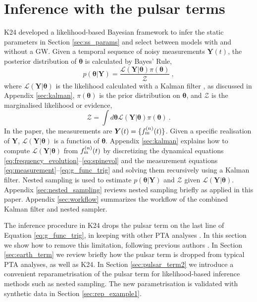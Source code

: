 \documentclass[fleqn,usenatbib,useAMS]{mnras}
\begin{document}
\section{Inference with the pulsar terms}\label{sec:pulsar_term}
K24 developed a likelihood-based Bayesian framework to infer the static parameters in Section \ref{sec:ss_params} and select between models with and without a GW. Given a temporal sequence of noisy measurements $\boldsymbol{Y}(t)$, the posterior distribution of $\boldsymbol{\theta}$ is calculated by Bayes' Rule,
\begin{equation}
	p(\boldsymbol{\theta} | \boldsymbol{Y}) = \frac{\mathcal{L}(\boldsymbol{Y} | \boldsymbol{\theta}) \pi(\boldsymbol{\theta})}{\mathcal{Z}} \ ,
\end{equation}
where $\mathcal{L}(\boldsymbol{Y}| \boldsymbol{\theta})$ is the likelihood calculated with a Kalman filter \citep{Kalman1}, as discussed in Appendix \ref{sec:kalman}, $\pi(\boldsymbol{\theta})$ is the prior distribution on $\boldsymbol{\theta}$, and $\mathcal{Z}$ is the marginalised likelihood or evidence,
\begin{equation}
	\mathcal{Z} = \int d \boldsymbol{\theta} \mathcal{L}(\boldsymbol{Y} | \boldsymbol{\theta})  \pi(\boldsymbol{\theta})  \ . \label{eq:model_evidence}
\end{equation}
In the paper, the measurements are ${\boldsymbol{Y}}(t) = \{ f_{\rm m}^{(n)}(t) \}$. Given a specific realisation of $\boldsymbol{Y}$, $\mathcal{L}(\boldsymbol{Y}| \boldsymbol{\theta})$ is a function of $\boldsymbol{\theta}$. Appendix \ref{sec:kalman} explains how to compute ${\mathcal{L}}({\boldsymbol{Y}}|{\boldsymbol{\theta}})$ from $f_{\rm m}^{(n)}(t)$ by discretizing the dynamical equations \eqref{eq:frequency_evolution}--\eqref{eq:spinevol} and the measurement equations \eqref{eq:measurement}--\eqref{eq:g_func_trig} and solving them recursively using a Kalman filter. Nested sampling \citep{Skilling} is used to estimate $p(\boldsymbol{\theta} | \boldsymbol{Y})$ and $\mathcal{Z}$ given ${\mathcal{L}}({\boldsymbol{Y}}|{\boldsymbol{\theta}})$. Appendix \ref{sec:nested_sampling} reviews nested sampling briefly as applied in this paper. Appendix \ref{sec:workflow} summarizes the workflow of the combined Kalman filter and nested sampler. \newline 
 
 
The inference procedure in K24 drops the pulsar term on the last line of Equation \eqref{eq:g_func_trig}, in keeping with other PTA analyses \citep[e.g.][]{Sesana2010,Babak2012,Petiteau2013,Zhu2015,Taylors2016,Goldstein2018,Charisi2023arXiv230403786C}. In this section we show how to remove this limitation, following previous authors \cite{Zhupulsarterms,Chen2022}. In Section \ref{sec:earth_term} we review briefly how the pulsar term is dropped from typical PTA analyses, as well as K24. In Section \ref{sec:pulsar_term2} we introduce a convenient reparametrisation of the pulsar term for likelihood-based inference methods such as nested sampling. The new parametrisation is validated with synthetic data in Section \ref{sec:rep_example1}.
\end{document}

